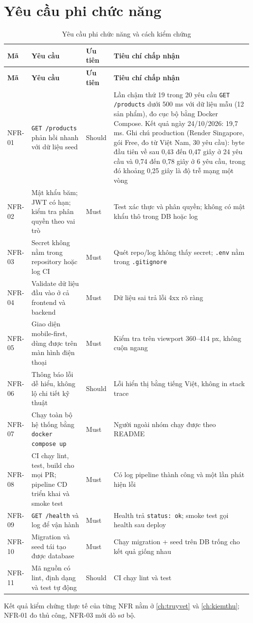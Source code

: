 \section{Yêu cầu phi chức năng}\label{sec:se-nfr}
{\small
\begin{longtable}{@{}p{1.3cm}p{5.3cm}p{1.2cm}p{6.6cm}@{}}
\caption{Yêu cầu phi chức năng và cách kiểm chứng}\label{tab:nfr}\\
\toprule \textbf{Mã} & \textbf{Yêu cầu} & \textbf{Ưu tiên} & \textbf{Tiêu chí chấp nhận} \\ \midrule \endfirsthead
\toprule \textbf{Mã} & \textbf{Yêu cầu} & \textbf{Ưu tiên} & \textbf{Tiêu chí chấp nhận} \\ \midrule \endhead
\bottomrule \endlastfoot
NFR-01 & \texttt{GET /\allowbreak{}products} phản hồi nhanh với dữ liệu seed & Should & Lần chậm thứ 19 trong 20 yêu cầu \texttt{GET /\allowbreak{}products} dưới 500 ms với dữ liệu mẫu (12 sản phẩm), đo cục bộ bằng Docker Compose. Kết quả ngày 24/10/2026: 19,7 ms. Ghi chú production (Render Singapore, gói Free, đo từ Việt Nam, 30 yêu cầu): byte đầu tiên về sau 0,43 đến 0,47 giây ở 24 yêu cầu và 0,74 đến 0,78 giây ở 6 yêu cầu, trong đó khoảng 0,25 giây là độ trễ mạng một vòng \\
NFR-02 & Mật khẩu băm; JWT có hạn; kiểm tra phân quyền theo vai trò & Must & Test xác thực và phân quyền; không có mật khẩu thô trong DB hoặc log \\
NFR-03 & Secret không nằm trong repository hoặc log CI & Must & Quét repo/log không thấy secret; \texttt{.env} nằm trong \texttt{.gitignore} \\
NFR-04 & Validate dữ liệu đầu vào ở cả frontend và backend & Must & Dữ liệu sai trả lỗi 4xx rõ ràng \\
NFR-05 & Giao diện mobile-first, dùng được trên màn hình điện thoại & Must & Kiểm tra trên viewport 360–414 px, không cuộn ngang \\
NFR-06 & Thông báo lỗi dễ hiểu, không lộ chi tiết kỹ thuật & Should & Lỗi hiển thị bằng tiếng Việt, không in stack trace \\
NFR-07 & Chạy toàn bộ hệ thống bằng \texttt{docker compose up} & Must & Người ngoài nhóm chạy được theo README \\
NFR-08 & CI chạy lint, test, build cho mọi PR; pipeline CD triển khai và smoke test & Must & Có log pipeline thành công và một lần phát hiện lỗi \\
NFR-09 & \texttt{GET /\allowbreak{}health} và log để vận hành & Must & Health trả \texttt{status: ok}; smoke test gọi health sau deploy \\
NFR-10 & Migration và seed tái tạo được database & Must & Chạy migration + seed trên DB trống cho kết quả giống nhau \\
NFR-11 & Mã nguồn có lint, định dạng và test tự động & Should & CI chạy lint và test \\
\end{longtable}}
Kết quả kiểm chứng thực tế của từng NFR nằm ở \cref{ch:truyvet} và \cref{ch:kiemthu}; NFR-01 đo thủ công, NFR-03 mới dò sơ bộ.

